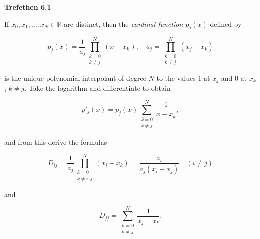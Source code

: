 \textbf{Trefethen 6.1}

If $x_0, x_1, \ldots, x_N \in \mathbb{R}$ are distinct, then the \textit{cardinal function $p_j(x)$} defined by 

$$
p_j(x) = \frac{1}{a_j} \prod\limits_{\substack{k=0 \\ k \neq j}}^{N}(x - x_k), \quad a_j = \prod\limits_{\substack{k=0 \\ k \neq j}}^{N}(x_j - x_k)
$$

is the unique polynomial interpolant of degree $N$ to the values 1 at $x_j$ and 0 at $x_k$, $k \neq j$. Take the 
logarithm and differentiate to obtain 

$$
p'_j(x) = p_j(x) \sum\limits_{\substack{k=0 \\ k \neq j}}^N \frac{1}{x - x_k},
$$

and from this derive the formulas

$$
D_{ij} = \frac{1}{a_j} \prod\limits_{\substack{k=0 \\ k \neq i,j}}^N (x_i - x_k) = \frac{a_i}{a_j(x_i - x_j)} \quad (i \neq j)
$$

and 

$$
D_{jj} = \sum\limits_{\substack{k=0 \\ k \neq j}}^N \frac{1}{x_j - x_k}.
$$

